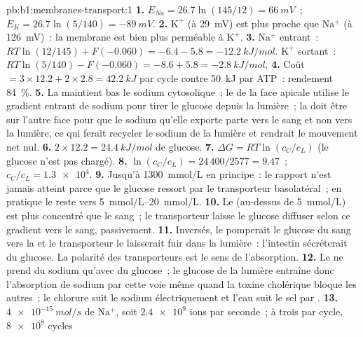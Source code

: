 \begin{solution}{pb:b1:membranes-transport:1}
\textbf{1.} $E_{Na} = 26.7\ln(145/12) = \qty{+66}{mV}$~; $E_K =
26.7\ln(5/140) = \qty{-89}{mV}$.
\textbf{2.} $\mathrm{K^+}$ (à \qty{29}{mV}) est plus proche que
$\mathrm{Na^+}$ (à \qty{126}{mV})~: la membrane est bien plus perméable
à $\mathrm{K^+}$.
\textbf{3.} $\mathrm{Na^+}$ entrant~: $RT\ln(12/145) + F(-0.060) = -6.4 -
5.8 = \qty{-12.2}{kJ/mol}$. $\mathrm{K^+}$ sortant~: $RT\ln(5/140) -
F(-0.060) = -8.6 + 5.8 = \qty{-2.8}{kJ/mol}$.
\textbf{4.} Coût $= 3\times 12.2 + 2\times 2.8 = \qty{42.2}{kJ}$ par
cycle contre \qty{50}{kJ} par ATP~: rendement \qty{84}{\%}.
\textbf{5.} La  maintient bas le sodium cytosolique~; le 
de la face apicale utilise le gradient entrant de sodium pour tirer le
glucose depuis la lumière~; la  doit être sur l'autre face pour que
le sodium qu'elle exporte parte vers le sang et non vers la lumière, ce
qui ferait recycler le sodium de la lumière et rendrait le mouvement net
nul.
\textbf{6.} $2\times 12.2 = \qty{24.4}{kJ/mol}$ de glucose.
\textbf{7.} $\Delta G = RT\ln(c_C/c_L)$ (le glucose n'est pas chargé).
\textbf{8.} $\ln(c_C/c_L) = 24\,400/2577 = 9.47$~; $c_C/c_L =
\num{1.3e4}$.
\textbf{9.} Jusqu'à \qty{1300}{mmol/L} en principe~: le rapport n'est
jamais atteint parce que le glucose ressort par le transporteur
basolatéral~; en pratique le  reste vers
\qtyrange{5}{20}{mmol/L}.
\textbf{10.} Le  (au-dessus de \qty{5}{mmol/L}) est plus
concentré que le sang~; le transporteur laisse le glucose diffuser
selon ce gradient vers le sang, passivement.
\textbf{11.} Inversés, le  pomperait le glucose du sang vers
la  et le transporteur le laisserait fuir dans la lumière~:
l'intestin sécréterait du glucose. La polarité des transporteurs est le
sens de l'absorption.
\textbf{12.} Le  ne prend du sodium qu'avec du glucose~; le
glucose de la lumière entraîne donc l'absorption de sodium par cette
voie même quand la toxine cholérique bloque les autres~; le chlorure
suit le sodium électriquement et l'eau suit le sel par .
\textbf{13.} $\qty{4e-15}{mol/s}$ de $\mathrm{Na^+}$, soit
$\num{2.4e9}$ ions par seconde~; à trois par cycle, $\num{8e8}$ cycles

\end{solution}

